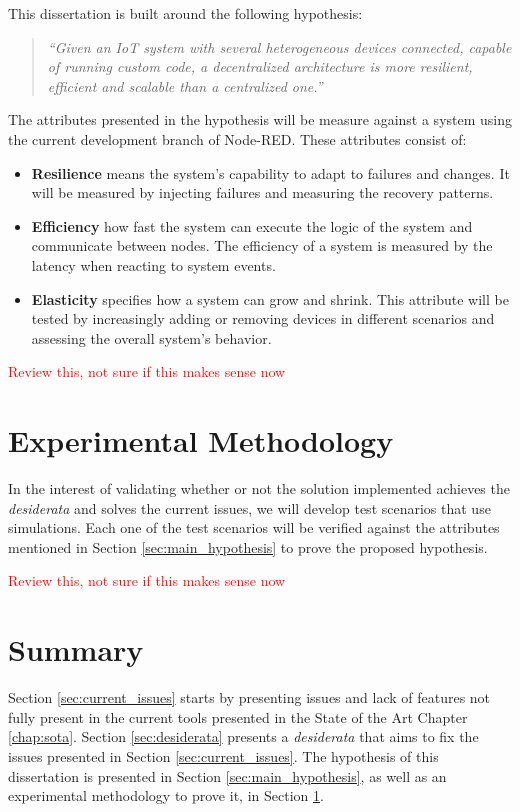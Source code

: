 This dissertation is built around the following hypothesis:

\begin{quote}
    \emph{``Given an IoT system with several heterogeneous devices connected, capable of running custom code, a decentralized architecture is more resilient, efficient and scalable than a centralized one.''}
\end{quote}

The attributes presented in the hypothesis will be measure against a system using the current development branch of Node-RED. These attributes consist of:

\begin{itemize}
    \item \textbf{Resilience} means the system's capability to adapt to failures and changes. It will be measured by injecting failures and measuring the recovery patterns.
    \item \textbf{Efficiency} how fast the system can execute the logic of the system and communicate between nodes. The efficiency of a system is measured by the latency when reacting to system events. 
    \item \textbf{Elasticity} specifies how a system can grow and shrink. This attribute will be tested by increasingly adding or removing devices in different scenarios and assessing the overall system's behavior.
\end{itemize}

\textcolor{red}{Review this, not sure if this makes sense now}

\section{Experimental Methodology}\label{sec:exp_meth}

In the interest of validating whether or not the solution implemented achieves the \emph{desiderata} and solves the current issues, we will develop test scenarios that use simulations. Each one of the test scenarios will be verified against the attributes mentioned in Section \ref{sec:main_hypothesis} to prove the proposed hypothesis.

\textcolor{red}{Review this, not sure if this makes sense now}

\section{Summary}\label{sec:stat_summary}

Section \ref{sec:current_issues} starts by presenting issues and lack of features not fully present in the current tools presented in the State of the Art Chapter \ref{chap:sota}. Section \ref{sec:desiderata} presents a \textit{desiderata} that aims to fix the issues presented in Section \ref{sec:current_issues}. The hypothesis of this dissertation is presented in Section \ref{sec:main_hypothesis}, as well as an experimental methodology to prove it, in Section \ref{sec:exp_meth}.
